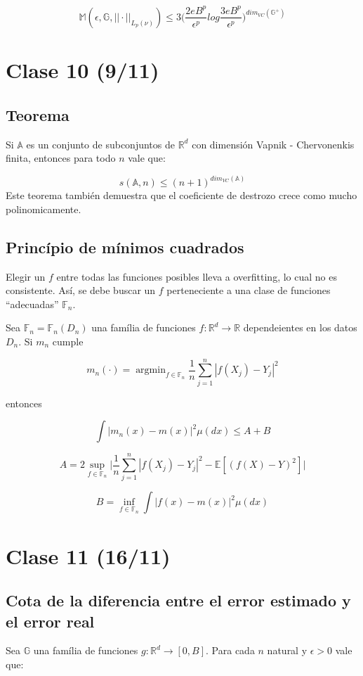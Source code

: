 \documentclass[12pt, a4paper]{article}
\begin{document}
$$
\mathds{M}(\epsilon,\mathds{G},||\cdot||_{L_p(\nu)})\leq 3 \bigg( \frac{2eB^p}{\epsilon^p} log \frac{3eB^p}{\epsilon^p} \bigg)^{dim_{VC}(\mathds{G}^{+})}
$$
\section{Clase 10 (9/11)}
\subsection{Teorema}
Si $\mathds{A}$ es un conjunto de subconjuntos de $\mathds{R}^d$ con dimensión Vapnik - Chervonenkis finita, entonces para todo $n$ vale que:

$$
s(\mathds{A},n)\leq(n+1)^{dim_{VC}(\mathds{A})}
$$
Este teorema también demuestra que el coeficiente de destrozo crece como mucho polinomicamente.

\subsection{Princípio de mínimos cuadrados}
Elegir un $f$ entre todas las funciones posibles lleva a overfitting, lo cual no es consistente. Así, se debe buscar un $f$ perteneciente a una clase de funciones ``adecuadas'' $\mathds{F}_n$.

Sea $\mathds{F}_n=\mathds{F}_n(D_n)$ una família de funciones $f:\mathds{R}^d \rightarrow \mathds{R}$ dependeientes en los datos $D_n$. Si $m_n$ cumple

$$
m_n(\cdot) = \mathop{argmin}_{f\in\mathds{F}_n} \frac{1}{n} \sum_{j=1}^n | f(X_j) - Y_j |^2
$$

entonces

$$
\int |m_n(x) - m(x)|^2 \mu(dx) \leq A + B
$$

$$
A=2 \mathop{sup}_{f\in\mathds{F}_n} \Big| \frac{1}{n} \sum_{j=1}^n |f(X_j)-Y_j|^2 -\mathds{E}[ (f(X)-Y)^2 ] \Big|
$$

$$
B=\mathop{inf}_{f\in\mathds{F}_n} \int | f(x)-m(x) |^2 \mu(dx)
$$

\section{Clase 11 (16/11)}
\subsection{Cota de la diferencia entre el error estimado y el error real}
Sea $\mathds{G}$ una família de funciones $g:\mathds{R}^d\rightarrow [0,B]$. Para cada $n$ natural y $\epsilon>0$ vale que:
\end{document}
